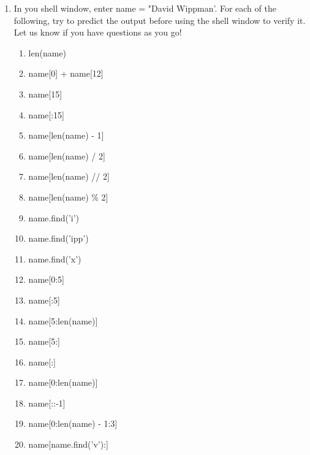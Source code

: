 \documentclass[11pt, letterpaper, onecolumn, oneside, final]{article}
\begin{document}
\begin{enumerate}
\item In you shell window, enter {\consolas name = "David Wippman'}.
For each of the following, try to predict the output before using the shell window to verify it. Let us
know if you have questions as you go!
\begin{enumerate}
\item {\consolas len(name)}\\
\item {\consolas name[0] + name[12]}\\
\item {\consolas name[15]}\\
\item {\consolas name[:15]}\\
\item {\consolas name[len(name) - 1]}\\
\item {\consolas name[len(name) / 2]}\\
\item {\consolas name[len(name) // 2]}\\
\item {\consolas name[len(name) \% 2]}\\
\item {\consolas name.find('i')}\\
\item {\consolas name.find('ipp')}\\
\item {\consolas name.find('x')}\\
\item {\consolas name[0:5]}\\
\item {\consolas name[:5]}\\
\item {\consolas name[5:len(name)]}\\
\item {\consolas name[5:]}\\
\item {\consolas name[:]}\\
\item {\consolas name[0:len(name)]}\\
\item {\consolas name[::-1]}\\
\item {\consolas name[0:len(name) - 1:3]}\\
\item {\consolas name[name.find('v'):]}\\

\end{enumerate}
\end{enumerate}
\end{document}

